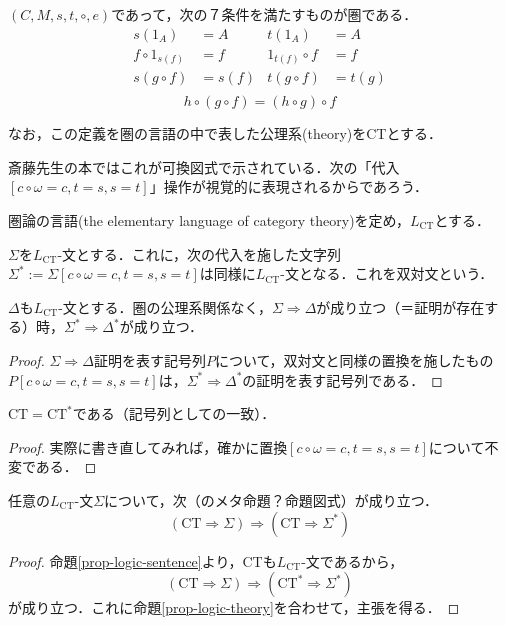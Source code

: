 \documentclass[uplatex, 12pt, dvipdfmx]{jsarticle}
\begin{document}
\begin{definition*}[圏の形式的定義]
    $(C,M,s,t,\circ,e)$であって，次の７条件を満たすものが圏である．
    \begin{align*}
        s(1_A) &=A & t(1_A) &=A \\
        f\circ 1_{s(f)} &=f & 1_{t(f)}\circ f &=f \\
        s(g\circ f) &= s(f)& t(g\circ f) &= t(g) \\
    \end{align*}
    \[h\circ (g\circ f) = (h\circ g)\circ f\]

    なお，この定義を圏の言語の中で表した公理系(theory)をCTとする．
\end{definition*}
斎藤先生の本ではこれが可換図式で示されている．次の「代入$[c\circ\omega =c, t=s,s=t]$」操作が視覚的に表現されるからであろう．

\begin{definition*}[圏の言語]
    圏論の言語(the elementary language of category theory)を定め，$L_{\mathrm{CT}}$とする．
\end{definition*}

\begin{definition*}[双対文]
    $\Sigma$を$L_{\mathrm{CT}}$-文とする．これに，次の代入を施した文字列$\Sigma^*:=\Sigma[c\circ\omega =c, t=s,s=t]$は同様に$L_{\mathrm{CT}}$-文となる．これを双対文という．
\end{definition*}

\begin{proposition*}\label{prop-logic-sentence}
    $\Delta$も$L_{\mathrm{CT}}$-文とする．圏の公理系関係なく，$\Sigma\Rightarrow\Delta$が成り立つ（＝証明が存在する）時，$\Sigma^*\Rightarrow\Delta^*$が成り立つ．
\end{proposition*}
\begin{proof}
    $\Sigma\Rightarrow\Delta$証明を表す記号列$P$について，双対文と同様の置換を施したもの$P[c\circ\omega =c, t=s,s=t]$は，$\Sigma^*\Rightarrow\Delta^*$の証明を表す記号列である．
\end{proof}

\begin{proposition*}\label{prop-logic-theory}
    $\mathrm{CT}=\mathrm{CT}^*$である（記号列としての一致）．
\end{proposition*}
\begin{proof}
    実際に書き直してみれば，確かに置換$[c\circ\omega =c, t=s,s=t]$について不変である．
\end{proof}

\begin{proposition}
    任意の$L_{\mathrm{CT}}$-文$\Sigma$について，次（のメタ命題？命題図式）が成り立つ．
    \[ (\mathrm{CT}\Rightarrow\Sigma) \Rightarrow (\mathrm{CT}\Rightarrow\Sigma^*) \]
\end{proposition}
\begin{proof}
    命題\ref{prop-logic-sentence}より，CTも$L_{\mathrm{CT}}$-文であるから，
    \[ (\mathrm{CT}\Rightarrow\Sigma) \Rightarrow (\mathrm{CT}^*\Rightarrow\Sigma^*) \]
    が成り立つ．これに命題\ref{prop-logic-theory}を合わせて，主張を得る．
\end{proof}
\end{document}
